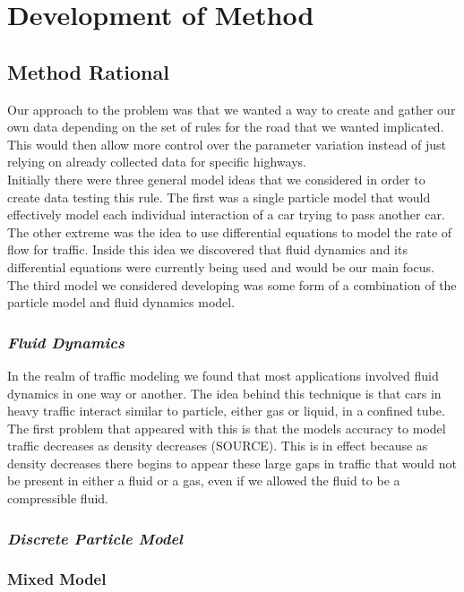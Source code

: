 \documentclass{amsart}
\begin{document}
		


\section{\bfseries{Development of Method}}
	\subsection{Method Rational}
	Our approach to the problem was that we wanted a way to create and gather our own data depending on the set of rules for the road that we wanted implicated.  This would then allow more control over the parameter variation instead of just relying on already collected data for specific highways.  \\
	
	Initially there were three general model ideas that we considered in order to create data testing this rule. The first was a single particle model that would effectively model each individual interaction of a car trying to pass another car.  The other extreme was the idea to use differential equations to model the rate of flow for traffic.  Inside this idea we discovered that fluid dynamics and its differential equations were currently being used and would be our main focus.  The third model we considered developing was some form of a combination of the particle model and fluid dynamics model. 
		
		\subsubsection{\it Fluid Dynamics}
		In the realm of traffic modeling we found that most applications involved fluid dynamics in one way or another.  The idea behind this technique is that cars in heavy traffic interact similar to particle, either gas or liquid, in a confined tube.  The first problem that appeared with this is that the models accuracy to model traffic decreases as density decreases (SOURCE).  This is in effect because as density decreases there begins to appear these large gaps in traffic that would not be present in either a fluid or a gas, even if we allowed the fluid to be a compressible fluid.  

		\subsubsection{\it Discrete Particle Model}
		
		\subsubsection{Mixed Model}
\end{document}
